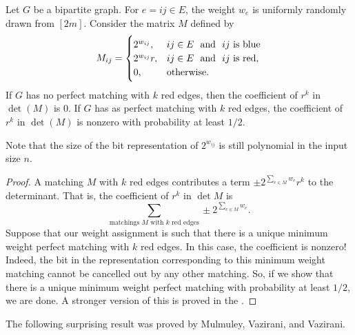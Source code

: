 \begin{ftheo}
	\label{randomized red-blue matching}
	Let $G$ be a bipartite graph. For $e = ij \in E$, the weight $w_e$ is uniformly randomly drawn from $[2m]$. Consider the matrix $M$ defined by
	\[ M_{ij} = \begin{cases} 2^{w_{ij}}, & \text{$ij \in E$ \text{ and } $ij$ is blue} \\ 2^{w_{ij}} r, & \text{$ij \in E$ \text{ and } $ij$ is red}, \\ 0, & \text{otherwise.} \end{cases} \]
	If $G$ has no perfect matching with $k$ red edges, then the coefficient of $r^k$ in $\det(M)$ is $0$. If $G$ has as perfect matching with $k$ red edges, the coefficient of $r^k$ in $\det(M)$ is nonzero with probability at least $1/2$.
\end{ftheo}
Note that the size of the bit representation of $2^{w_{ij}}$ is still polynomial in the input size $n$.
\begin{proof}
	A matching $M$ with $k$ red edges contributes a term $\pm 2^{\sum_{e \in M} w_e} r^k$ to the determinant. That is, the coefficient of $r^k$ in $\det M$ is
	\[ \sum_{\text{matchings $M$ with $k$ red edges}} \pm 2^{\sum_{e \in M} w_e}. \]
	Suppose that our weight assignment is such that there is a unique minimum weight perfect matching with $k$ red edges. In this case, the coefficient is nonzero! Indeed, the bit in the representation corresponding to this minimum weight matching cannot be cancelled out by any other matching. So, if we show that there is a unique minimum weight perfect matching with probability at least $1/2$, we are done. A stronger version of this is proved in the .
\end{proof}

The following surprising result was proved by Mulmuley, Vazirani, and Vazirani.

